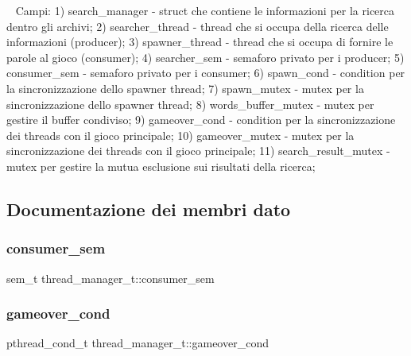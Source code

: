 ~\newline
Campi\+: 1) search\+\_\+manager -\/ struct che contiene le informazioni per la ricerca dentro gli archivi; 2) searcher\+\_\+thread -\/ thread che si occupa della ricerca delle informazioni (producer); 3) spawner\+\_\+thread -\/ thread che si occupa di fornire le parole al gioco (consumer); 4) searcher\+\_\+sem -\/ semaforo privato per i producer; 5) consumer\+\_\+sem -\/ semaforo privato per i consumer; 6) spawn\+\_\+cond -\/ condition per la sincronizzazione dello spawner thread; 7) spawn\+\_\+mutex -\/ mutex per la sincronizzazione dello spawner thread; 8) words\+\_\+buffer\+\_\+mutex -\/ mutex per gestire il buffer condiviso; 9) gameover\+\_\+cond -\/ condition per la sincronizzazione dei threads con il gioco principale; 10) gameover\+\_\+mutex -\/ mutex per la sincronizzazione dei threads con il gioco principale; 11) search\+\_\+result\+\_\+mutex -\/ mutex per gestire la mutua esclusione sui risultati della ricerca; 

\subsection{Documentazione dei membri dato}
\mbox{\label{structthread__manager__t_add09eb9696fcde21f6ea575747dd9bc6}} 
\subsubsection{\texorpdfstring{consumer\+\_\+sem}{consumer\_sem}}
{\footnotesize\ttfamily sem\+\_\+t thread\+\_\+manager\+\_\+t\+::consumer\+\_\+sem}

\mbox{\label{structthread__manager__t_adc9c0bc7d1a31425ee832c85e2568a4c}} 
\subsubsection{\texorpdfstring{gameover\+\_\+cond}{gameover\_cond}}
{\footnotesize\ttfamily pthread\+\_\+cond\+\_\+t thread\+\_\+manager\+\_\+t\+::gameover\+\_\+cond}

